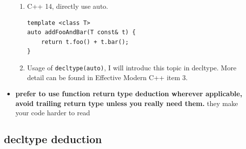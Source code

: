 \documentclass[a4paper,11pt,twoside]{book}
\begin{document}
\begin{itemize}
\begin{enumerate}
\item C++ 14, directly use auto.
\begin{lstlisting}[numbers=none]
template <class T>
auto addFooAndBar(T const& t) {
    return t.foo() + t.bar();
}
\end{lstlisting}

\item Usage of \texttt{decltype(auto)}, I will introduc this topic in decltype. More detail can be found in Effective Modern C++ item 3.
	\end{enumerate}
	
	\item \textbf{prefer to use function return type deduction wherever applicable, avoid trailing return type unless you really need them.} they make your code harder to read

\end{itemize}


\subsection{decltype deduction}
\end{document}
